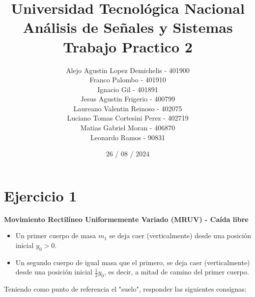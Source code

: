 \documentclass[12pt,a4paper]{report}
\title{%
  \fontsize{25}{0}\selectfont Universidad Tecnológica Nacional \\
  \fontsize{22}{30}\selectfont Análisis de Señales y Sistemas \\
  \fontsize{20}{25}\selectfont Trabajo Practico 2
}
\author{
Alejo Agustin Lopez Demichelis - 401900\\
Franco Palombo - 401910\\
Ignacio Gil - 401891\\
Jesus Agustin Frigerio - 400799\\
Laureano Valentin Reinoso - 402075\\
Luciano Tomas Cortesini Perez - 402719\\
Matias Gabriel Moran - 406870\\
Leonardo Ramos - 90831\\
}
\date{26 / 08 / 2024}
\newcommand\myemptypage{
    \null
    \thispagestyle{empty}
    \addtocounter{page}{-1}
    \newpage
    }
\begin{document}
\maketitle

\myemptypage

\tableofcontents

\chapter{Ejercicio 1}
\textbf{Movimiento Rectilíneo Uniformemente Variado (MRUV) - Caída libre}

\begin{itemize}[left=0pt]
  \item Un primer cuerpo de masa $m_1$ se deja caer (verticalmente) desde una posición inicial $y_0 > 0$.

  \item Un segundo cuerpo de igual masa que el primero, se deja caer (verticalmente) desde una posición inicial 
     $\frac{1}{2} y_0$, es decir, a mitad de camino del primer cuerpo.

\end{itemize}

Teniendo como punto de referencia el "suelo", responder las siguientes consignas:
\end{document}
